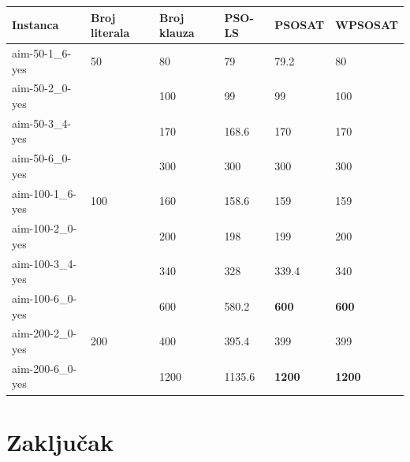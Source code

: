 \documentclass[a4paper]{article}
\begin{document}
\begin{table}[h!]
\centering
{}\label{tab:SAT} 
\begin{tabular}{ |p{2.5cm}|p{1.4cm}|p{1.4cm}||p{1.6cm}|p{1.6cm}|p{1.6cm}|}
\hline
 Instanca & Broj \break literala & Broj \break klauza & PSO-LS & PSOSAT & WPSOSAT \\
 \hline
 aim-50-1\_6-yes & 50 & 80 & 79 & 79.2 & 80 \\
 aim-50-2\_0-yes &  & 100 & 99 & 99 & 100 \\
 aim-50-3\_4-yes &  & 170 & 168.6 & 170 & 170 \\
 aim-50-6\_0-yes &  & 300 & 300 & 300 & 300 \\
 \hline
 aim-100-1\_6-yes & 100 & 160 & 158.6 & 159 & 159 \\
 aim-100-2\_0-yes &  & 200 & 198 & 199 & 200 \\
 aim-100-3\_4-yes &  & 340 & 328 & 339.4 & 340 \\ 
 aim-100-6\_0-yes &  & 600 & 580.2 & \textbf{600} & \textbf{600} \\
 \hline
 aim-200-2\_0-yes & 200 & 400 & 395.4 & 399 & 399 \\
 aim-200-6\_0-yes &  & 1200 & 1135.6 & \textbf{1200} & \textbf{1200} \\ 
 \hline
\end{tabular}
\end{table}


\section{Zaključak}
\label{sec:zakljucak}

\appendix
 

\end{document}

